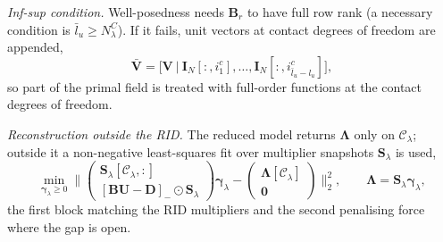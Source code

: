 \emph{Inf-sup condition.} Well-posedness needs $\mathbf B_r$ to have full row rank (a necessary condition is $\bar l_u\ge N^C_\lambda$). If it fails, unit vectors at contact degrees of freedom are appended,
\begin{equation}\label{eq:hb-enrich}
\bar{\mathbf V}=\big[\mathbf V\ \big|\ \mathbf I_N[:,i^c_1],\dots,\mathbf I_N[:,i^c_{\bar l_u-l_u}]\big],
\end{equation}
so part of the primal field is treated with full-order functions at the contact degrees of freedom.

\emph{Reconstruction outside the RID.} The reduced model returns $\boldsymbol\Lambda$ only on $\mathcal C_\lambda$; outside it a non-negative least-squares fit over multiplier snapshots $\mathbf S_\lambda$ is used,
\begin{equation}\label{eq:hb-nnls}
\min_{\boldsymbol\gamma_\lambda\ge0}\Big\lVert\begin{pmatrix}\mathbf S_\lambda[\mathcal C_\lambda,:]\\ [\mathbf B\mathbf U-\mathbf D]_{-}\odot\mathbf S_\lambda\end{pmatrix}\boldsymbol\gamma_\lambda-\begin{pmatrix}\boldsymbol\Lambda[\mathcal C_\lambda]\\\mathbf 0\end{pmatrix}\Big\rVert_2^2,\qquad\boldsymbol\Lambda=\mathbf S_\lambda\boldsymbol\gamma_\lambda,
\end{equation}
the first block matching the RID multipliers and the second penalising force where the gap is open.

